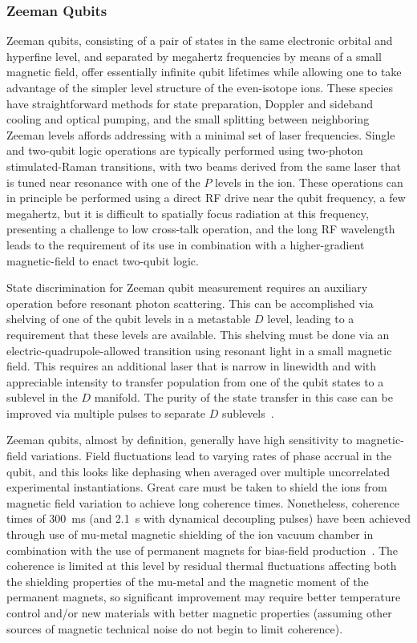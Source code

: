 \documentclass[%
reprint,
 amsmath,amssymb,
]{revtex4-1}
\begin{document}
\subsubsection{Zeeman Qubits}
\label{subsubZeeman}

Zeeman qubits, consisting of a pair of states in the same electronic orbital and hyperfine level, and separated by megahertz frequencies by means of a small magnetic field, offer essentially infinite qubit lifetimes while allowing one to take advantage of the simpler level structure of the even-isotope ions.  These species have straightforward methods for state preparation, Doppler and sideband cooling and optical pumping, and the small splitting between neighboring Zeeman levels affords addressing with a minimal set of laser frequencies.  Single and two-qubit logic operations are typically performed using two-photon stimulated-Raman transitions, with two beams derived from the same laser that is tuned near resonance with one of the $P$ levels in the ion.  These operations can in principle be performed using a direct RF drive near the qubit frequency, a few megahertz, but it is difficult to spatially focus radiation at this frequency, presenting a challenge to low cross-talk operation, and the long RF wavelength leads to the requirement of its use in combination with a higher-gradient magnetic-field to enact two-qubit logic.

State discrimination for Zeeman qubit measurement requires an auxiliary operation before resonant photon scattering.  This can be accomplished via shelving of one of the qubit levels in a metastable $D$ level, leading to a requirement that these levels are available.  This shelving must be done via an electric-quadrupole-allowed transition using resonant light in a small magnetic field.  This requires an additional laser that is narrow in linewidth and with appreciable intensity to transfer population from one of the qubit states to a sublevel in the $D$ manifold.  The purity of the state transfer in this case can be improved via multiple pulses to separate $D$ sublevels~\cite{KeselmanZeemanQubit2011}.

Zeeman qubits, almost by definition, generally have high sensitivity to magnetic-field variations.  Field fluctuations lead to varying rates of phase accrual in the qubit, and this looks like dephasing when averaged over multiple uncorrelated experimental instantiations.  Great care must be taken to shield the ions from magnetic field variation to achieve long coherence times.  Nonetheless, coherence times of 300~ms (and 2.1~s with dynamical decoupling pulses) have been achieved through use of mu-metal magnetic shielding of the ion vacuum chamber in combination with the use of permanent magnets for bias-field production~\cite{Ruster2016}.  The coherence is limited at this level by residual thermal fluctuations affecting both the shielding properties of the mu-metal and the magnetic moment of the permanent magnets, so significant improvement may require better temperature control and/or new materials with better magnetic properties (assuming other sources of magnetic technical noise do not begin to limit coherence).
\end{document}
